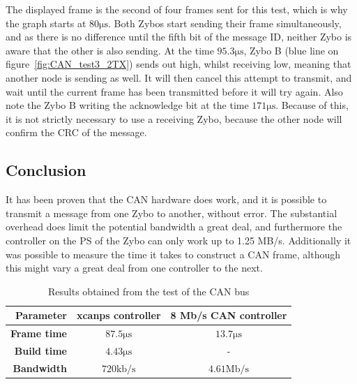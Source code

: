 The displayed frame is the second of four frames sent for this test, which is why the graph starts at $80 \si{\micro\second}$.
Both Zybos start sending their frame simultaneously, and as there is no difference until the fifth bit of the message ID, neither Zybo is aware that the other is also sending.
At the time $95.3\si{\micro\second}$, Zybo B (blue line on figure~\ref{fig:CAN_test3_2TX}) sends out high, whilst receiving low, meaning that another node is sending as well. 
It will then cancel this attempt to transmit, and wait until the current frame has been transmitted before it will try again.
Also note the Zybo B writing the acknowledge bit at the time $171 \si{\micro\second}$.
Because of this, it is not strictly necessary to use a receiving Zybo, because the other node will confirm the CRC of the message.\\

\subsection{Conclusion}\label{sub:CAN_test_conclusion}
It has been proven that the CAN hardware does work, and it is possible to transmit a message from one Zybo to another, without error.
The substantial overhead does limit the potential bandwidth a great deal, and furthermore the controller on the PS of the Zybo can only work up to 1.25 MB/s. 
Additionally it was possible to measure the time it takes to construct a CAN frame, although this might vary a great deal from one controller to the next.

\begin{table}[h!]
	\centering
	\begin{tabular}{r | c | c}
		\textbf{Parameter} & \textbf{xcanps controller} & \textbf{8 Mb/s CAN controller} \\
		\hline
		\textbf{Frame time} & $87.5 \si{\micro\second}$ & $13.7\si{\micro\second}$ \\
		\textbf{Build time} & $4.43 \si{\micro\second}$ & - \\
		\textbf{Bandwidth} & $720 \mathrm{kb/s}$ & $4.61 \mathrm{Mb/s}$
	\end{tabular}
	\caption{Results obtained from the test of the CAN bus}
	\label{tab:CAN_test_conclusion}
\end{table}
